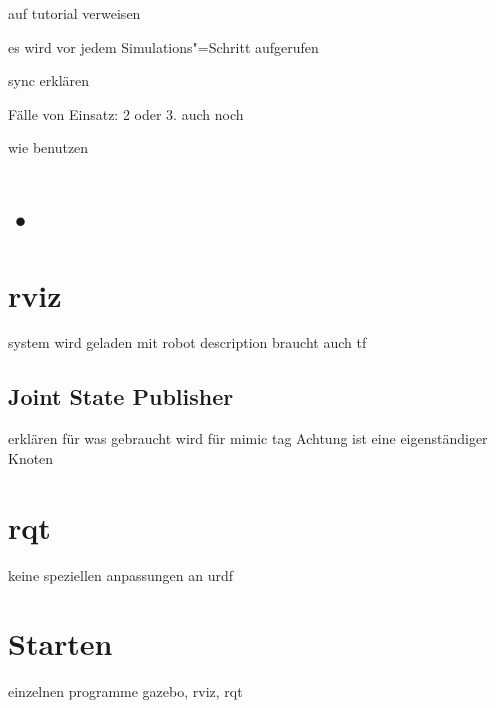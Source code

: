 auf tutorial verweisen

es wird vor jedem Simulations"=Schritt aufgerufen

sync erklären

Fälle von Einsatz: 2 oder 3. auch noch

wie benutzen 


\section{•}


\section{rviz}
system wird geladen mit robot description
braucht auch tf

\subsection{Joint State Publisher}
erklären für was gebraucht wird
für mimic tag
Achtung ist eine eigenständiger Knoten


\section{rqt}
keine speziellen anpassungen an urdf 

\section{Starten}
einzelnen programme gazebo, rviz, rqt


